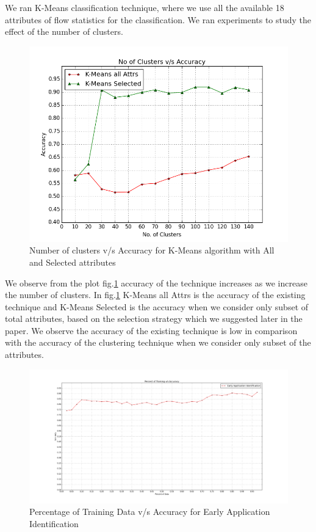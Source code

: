 \documentclass[conference]{IEEEtran}
\begin{document}
We ran K-Means classification technique, where we use all the available 18 attributes of flow statistics for the classification. We ran experiments to study the effect of the number of clusters\cite{}.
\begin{figure}[!t]
	\centering
	\includegraphics[width=7.16in]{k_means_selected_all}
	\caption{Number of clusters v/s Accuracy for K-Means algorithm with All and Selected attributes}
	\label{fig_k_means_all}
\end{figure}
We observe from the plot fig.\ref{fig_k_means_all} accuracy of the technique increases as we increase the number of clusters. In fig.\ref{fig_k_means_all} K-Means all Attrs is the accuracy of the existing technique \cite{} and K-Means Selected is the accuracy when we consider only subset of total attributes, based on the selection strategy which we suggested later in the paper. We observe the accuracy of the existing technique is low in comparison with the accuracy of the clustering technique when we consider only subset of the attributes. 

\begin{figure}[!t]
	\centering
	\includegraphics[width=7.16in]{early_application_result}
	\caption{Percentage of Training Data v/s Accuracy for Early Application Identification}
	\label{fig:early_app_identification}
\end{figure}
\end{document}
